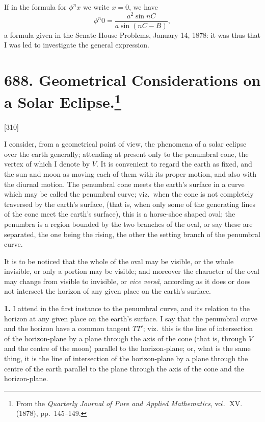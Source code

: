 \documentclass[12pt,a4paper]{article}
\theoremstyle{definition}
\begin{document}
If in the formula for $\phi^n x$ we write $x = 0$, we have
\[
\phi^n 0 = \frac{a^2\sin nC}{a\sin(nC - B)},
\]
a formula given in the Senate-House Problems, January 14, 1878: it was thus that I was led to investigate the general expression.

\newpage
\section[Geometrical Considerations on a Solar Eclipse]{688. Geometrical Considerations on a Solar Eclipse.\footnote{From the \textit{Quarterly Journal of Pure and Applied Mathematics}, vol.\ XV. (1878), pp.\ 145--149.}}

[310]

I consider, from a geometrical point of view, the phenomena of a solar eclipse over the earth generally; attending at present only to the penumbral cone, the vertex of which I denote by $V$. It is convenient to regard the earth as fixed, and the sun and moon as moving each of them with its proper motion, and also with the diurnal motion. The penumbral cone meets the earth's surface in a curve which may be called the penumbral curve; viz.\ when the cone is not completely traversed by the earth's surface, (that is, when only some of the generating lines of the cone meet the earth's surface), this is a horse-shoe shaped oval; the penumbra is a region bounded by the two branches of the oval, or say these are separated, the one being the rising, the other the setting branch of the penumbral curve.

It is to be noticed that the whole of the oval may be visible, or the whole invisible, or only a portion may be visible; and moreover the character of the oval may change from visible to invisible, or \textit{vice vers\^a}, according as it does or does not intersect the horizon of any given place on the earth's surface.

\medskip
\noindent\textbf{1.}\quad
I attend in the first instance to the penumbral curve, and its relation to the horizon at any given place on the earth's surface. I say that the penumbral curve and the horizon have a common tangent $TT'$; viz.\ this is the line of intersection of the horizon-plane by a plane through the axis of the cone (that is, through $V$ and the centre of the moon) parallel to the horizon-plane; or, what is the same thing, it is the line of intersection of the horizon-plane by a plane through the centre of the earth parallel to the plane through the axis of the cone and the horizon-plane.
\end{document}
